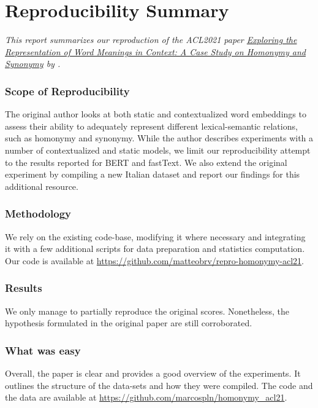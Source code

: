\section*{\centering Reproducibility Summary}

\textit{This report summarizes our reproduction of the ACL2021 paper \href{https://aclanthology.org/2021.acl-long.281/}{Exploring the Representation of Word Meanings in Context: A Case Study on Homonymy and Synonymy} by \citet{garcia:acl}.}

\subsubsection*{Scope of Reproducibility}

The original author looks at both static and contextualized word embeddings to assess their ability to adequately represent different lexical-semantic relations, such as homonymy and synonymy. While the author describes experiments with a number of contextualized and static models, we limit our reproducibility attempt to the results reported for BERT and fastText. We also extend the original experiment by compiling a new Italian dataset and report our findings for this additional resource.

\subsubsection*{Methodology}

We rely on the existing code-base, modifying it where necessary and integrating it with a few additional scripts for data preparation and statistics computation. Our code is available at \url{https://github.com/matteobrv/repro-homonymy-acl21}.

\subsubsection*{Results}

We only manage to partially reproduce the original scores. Nonetheless, the hypothesis formulated in the original paper are still corroborated.

\subsubsection*{What was easy}

Overall, the paper is clear and provides a good overview of the experiments. It outlines the structure of the data-sets and how they were compiled. The code and the data are available at \url{https://github.com/marcospln/homonymy_acl21}.

